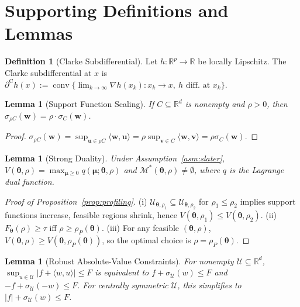 \documentclass[11pt]{article}
\newcommand{\R}{\mathbb{R}}
\newcommand{\cU}{\mathcal{U}}
\newcommand{\cM}{\mathcal{M}}
\newcommand{\ip}[2]{\langle #1, #2 \rangle}
\newcommand{\btheta}{\bm{\theta}}
\newcommand{\bmu}{\bm{\mu}}
\newcommand{\bu}{\bm{u}}
\newcommand{\bw}{\bm{w}}
\DeclareMathOperator{\conv}{conv}
\newcommand{\clsubd}{\partial^{\mathrm{C}}}
\newtheorem{lemma}[theorem]{Lemma}
\theoremstyle{definition}
\newtheorem{definition}{Definition}
\begin{document}
\newpage
\appendix

\section{Supporting Definitions and Lemmas}
\label{app:supporting}

\begin{definition}[Clarke Subdifferential]\label{def:clarke}
Let $h:\R^p\to\R$ be locally Lipschitz. The Clarke subdifferential at $x$ is
$\clsubd h(x) := \conv\{\lim_{k\to\infty}\nabla h(x_k) : x_k\to x,\ h \text{ diff.\ at }x_k\}$.
\end{definition}

\begin{lemma}[Support Function Scaling]\label{lem:support-scaling}
If $C \subseteq \R^d$ is nonempty and $\rho > 0$, then $\sigma_{\rho C}(\bw) = \rho \cdot \sigma_C(\bw)$.
\end{lemma}

\begin{proof}
$\sigma_{\rho C}(\bw) = \sup_{\bu \in \rho C} \ip{\bw}{\bu} = \rho \sup_{\bm{v} \in C} \ip{\bw}{\bm{v}} = \rho \sigma_C(\bw)$.
\end{proof}

\begin{lemma}[Strong Duality]\label{lem:strong-duality}
Under Assumption~\ref{asm:slater}, $V(\btheta,\rho)=\max_{\bmu\ge 0} q(\bmu;\btheta,\rho)$ and $\cM^*(\btheta,\rho)\neq\emptyset$, where $q$ is the Lagrange dual function.
\end{lemma}

\begin{proof}[Proof of Proposition~\ref{prop:profiling}]
(i) $\cU_{\btheta,\rho_1} \subseteq \cU_{\btheta,\rho_2}$ for $\rho_1 \leq \rho_2$ implies support functions increase, feasible regions shrink, hence $V(\btheta,\rho_1) \leq V(\btheta,\rho_2)$.
(ii) $F_{\btheta}(\rho) \geq \tau$ iff $\rho \geq \rho_P(\btheta)$.
(iii) For any feasible $(\btheta,\rho)$, $V(\btheta,\rho) \geq V(\btheta,\rho_P(\btheta))$, so the optimal choice is $\rho = \rho_P(\btheta)$.
\end{proof}

\begin{lemma}[Robust Absolute-Value Constraints]\label{lem:robust-abs}
For nonempty $\cU\subseteq\R^d$, $\sup_{u\in\cU}|f+\ip{w}{u}|\le F$ is equivalent to $f+\sigma_{\cU}(w)\le F$ and $-f+\sigma_{\cU}(-w)\le F$. For centrally symmetric $\cU$, this simplifies to $|f|+\sigma_{\cU}(w)\le F$.
\end{lemma}
\end{document}
